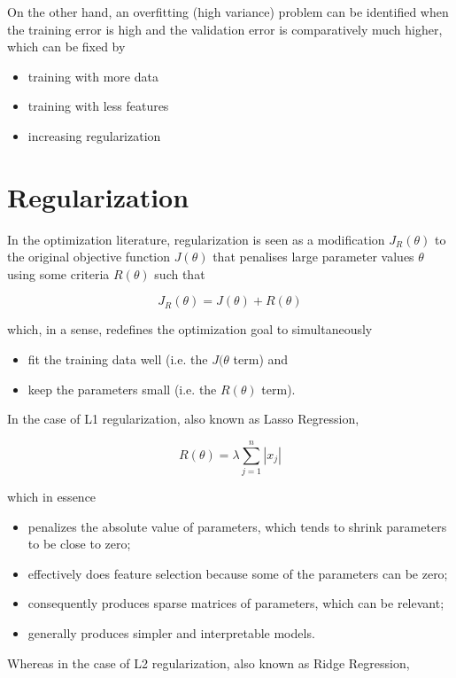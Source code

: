 On the other hand, an overfitting (high variance) problem can be identified when the training error is high and the validation error is comparatively much higher, which can be fixed by

\begin{itemize}
    \item training with more data
    \item training with less features
    \item increasing regularization
\end{itemize}

\section{Regularization}

In the optimization literature, regularization is seen as a modification $J_R(\theta)$ to the original objective function $J(\theta)$ that penalises large parameter values $\theta$ using some criteria $R(\theta)$ such that

$$
J_R(\theta) = J(\theta) + R(\theta)
$$

which, in a sense, redefines the optimization goal to simultaneously

\begin{itemize}
    \item fit the training data well (i.e. the $J(\theta$ term) and
    \item keep the parameters small (i.e. the $R(\theta)$ term).
\end{itemize}

In the case of L1 regularization, also known as Lasso Regression,

$$
R(\theta) = \lambda \sum_{j=1}^{n} |x_j|
$$

which in essence

\begin{itemize}
    \item penalizes the absolute value of parameters, which tends to shrink parameters to be close to zero;
    \item effectively does feature selection because some of the parameters can be zero;
    \item consequently produces sparse matrices of parameters, which can be relevant;
    \item generally produces simpler and interpretable models.
\end{itemize}

Whereas in the case of L2 regularization, also known as Ridge Regression,

